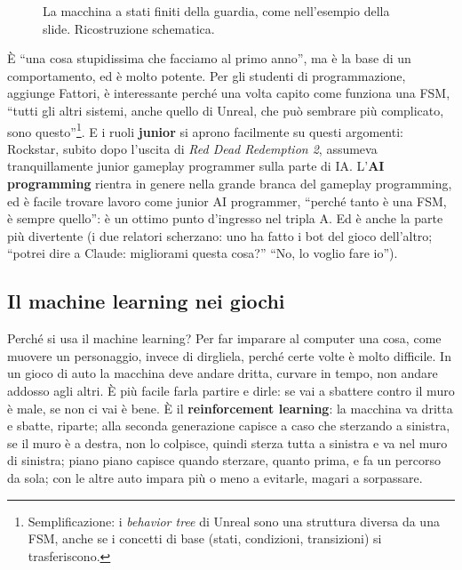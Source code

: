 \begin{figure}[htbp]
\centering
{}
\caption{La macchina a stati finiti della guardia, come nell'esempio della
slide. Ricostruzione schematica.}
\label{p5:fig:fsm}
\end{figure}

È ``una cosa stupidissima che facciamo al primo anno'', ma è la base di un
comportamento, ed è molto potente. Per gli studenti di programmazione,
aggiunge Fattori, è interessante perché una volta capito come funziona una
FSM, ``tutti gli altri sistemi, anche quello di Unreal, che può sembrare più
complicato, sono questo''\footnote{Semplificazione: i \emph{behavior tree} di
Unreal sono una struttura diversa da una FSM, anche se i concetti di base
(stati, condizioni, transizioni) si trasferiscono.}. E i ruoli
\textbf{junior} si aprono facilmente su questi argomenti: Rockstar, subito
dopo l'uscita di \emph{Red Dead Redemption 2}, assumeva tranquillamente junior
gameplay programmer sulla parte di IA. L'\textbf{AI programming} rientra in
genere nella grande branca del gameplay programming, ed è facile trovare
lavoro come junior AI programmer, ``perché tanto è una FSM, è sempre quello'':
è un ottimo punto d'ingresso nel tripla A. Ed è anche la parte più divertente
(i due relatori scherzano: uno ha fatto i bot del gioco dell'altro; ``potrei
dire a Claude: migliorami questa cosa?'' ``No, lo voglio fare io'').

\subsection{Il machine learning nei giochi}

Perché si usa il machine learning? Per far imparare al computer una cosa,
come muovere un personaggio, invece di dirgliela, perché certe volte è molto
difficile. In un gioco di auto la macchina deve andare dritta, curvare in
tempo, non andare addosso agli altri. È più facile farla partire e dirle: se
vai a sbattere contro il muro è male, se non ci vai è bene. È il
\textbf{reinforcement learning}: la macchina va dritta e sbatte, riparte;
alla seconda generazione capisce a caso che sterzando a sinistra, se il muro è
a destra, non lo colpisce, quindi sterza tutta a sinistra e va nel muro di
sinistra; piano piano capisce quando sterzare, quanto prima, e fa un percorso
da sola; con le altre auto impara più o meno a evitarle, magari a sorpassare.

